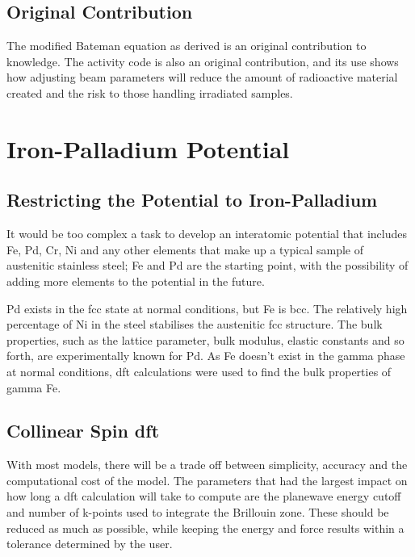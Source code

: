 \subsection{Original Contribution}

The modified Bateman equation as derived is an original contribution to knowledge.  The activity code is also an original contribution, and its use shows how adjusting beam parameters will reduce the amount of radioactive material created and the risk to those handling irradiated samples.



\section{Iron-Palladium Potential}

\subsection{Restricting the Potential to Iron-Palladium}

It would be too complex a task to develop an interatomic potential that includes Fe, Pd, Cr, Ni and any other elements that make up a typical sample of austenitic stainless steel; Fe and Pd are the starting point, with the possibility of adding more elements to the potential in the future.

Pd exists in the \acrshort{fcc} state at normal conditions, but Fe is \acrshort{bcc}.  The relatively high percentage of Ni in the steel stabilises the austenitic \acrshort{fcc} structure.  The bulk properties, such as the lattice parameter, bulk modulus, elastic constants and so forth, are experimentally known for Pd.  As Fe doesn't exist in the gamma phase at normal conditions, \acrshort{dft} calculations were used to find the bulk properties of gamma Fe.

\subsection{Collinear Spin \acrshort{dft}}

With most models, there will be a trade off between simplicity, accuracy and the computational cost of the model.  The parameters that had the largest impact on how long a \acrshort{dft} calculation will take to compute are the planewave energy cutoff and number of k-points used to integrate the Brillouin zone.  These should be reduced as much as possible, while keeping the energy and force results within a tolerance determined by the user.

